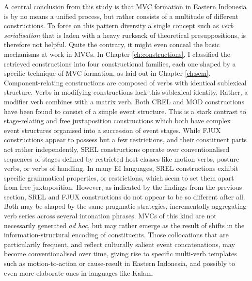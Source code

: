 A central conclusion from this study is that MVC formation in Eastern Indonesia is by no means a unified process, but rather consists of a multitude of different constructions. To force on this pattern diversity a single concept such as \textit{verb serialisation} that is laden with a heavy rucksack of theoretical presuppositions, is therefore not helpful. Quite the contrary, it might even conceal the basic mechanisms at work in MVCs. In Chapter \ref{ch:constructions}, I classified the retrieved constructions into four constructional families, each one shaped by a specific technique of MVC formation, as laid out in Chapter \ref{ch:sem}. Component-relating constructions are composed of verbs with identical sublexical structure. Verbs in modifying constructions lack this sublexical identity. Rather, a modifier verb combines with a matrix verb. Both CREL and MOD constructions have been found to consist of a simple event structure. This is a stark contrast to stage-relating and free juxtaposition constructions which both have complex event structures organised into a succession of event stages. While FJUX constructions appear to possess but a few restrictions, and their constituent parts act rather independently, SREL constructions operate over conventionalised sequences of stages defined by restricted host classes like motion verbs, posture verbs, or verbs of handling. In many EI languages, SREL constructions exhibit specific grammatical properties, or restrictions, which seem to set them apart from free juxtaposition. However, as indicated by the findings from the previous section, SREL and FJUX constructions do not appear to be so different after all. Both may be shaped by the same pragmatic strategies, incrementally aggregating verb series across several intonation phrases. MVCs of this kind are not necessarily generated \textit{ad hoc}, but may rather emerge as the result of shifts in the information-structural encoding of constituents. Those collocations that are particularily frequent, and reflect culturally salient event concatenations, may become conventionalised over time, giving rise to specific multi-verb templates such as motion-to-action or cause-result in Eastern Indonesia, and possibly to even more elaborate ones in languages like Kalam.

